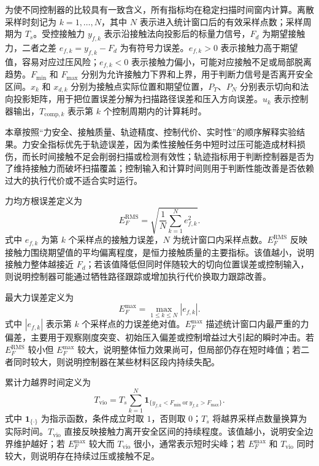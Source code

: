 为使不同控制器的比较具有一致含义，所有指标均在稳定扫描时间窗内计算。离散采样时刻记为 $k=1,\ldots,N$，其中 $N$ 表示进入统计窗口后的有效采样点数；采样周期为 $T_s$。受控接触力 $y_{f,k}$ 表示沿接触法向投影后的标量力信号，$F_d$ 为期望接触力，二者之差 $e_{f,k}=y_{f,k}-F_d$ 为有符号力误差。$e_{f,k}>0$ 表示接触力高于期望值，容易对应过压风险；$e_{f,k}<0$ 表示接触力偏小，可能对应接触不足或局部脱离趋势。$F_{\min}$ 和 $F_{\max}$ 分别为允许接触力下界和上界，用于判断力信号是否离开安全区间。$x_k$ 和 $x_{d,k}$ 分别为接触点实际位置和期望位置，$P_T$、$P_N$ 分别表示切向和法向投影矩阵，用于把位置误差分解为扫描路径误差和压入方向误差。$u_k$ 表示控制器输出，$T_{\mathrm{comp},k}$ 表示第 $k$ 个控制周期内的计算耗时。

本章按照“力安全、接触质量、轨迹精度、控制代价、实时性”的顺序解释实验结果。力安全指标优先于轨迹误差，因为柔性接触任务中短时过压可能造成材料损伤，而长时间接触不足会削弱扫描或检测有效性；轨迹指标用于判断控制器是否为了维持接触力而破坏扫描覆盖；控制输入和计算时间则用于判断性能改善是否依赖过大的执行代价或不适合实时运行。

力均方根误差定义为
\begin{equation}
  E_F^{\mathrm{RMS}}
  =\sqrt{\frac{1}{N}\sum_{k=1}^{N}e_{f,k}^2}.
  \label{eq:ch3_metric_force_rms}
\end{equation}
式中 $e_{f,k}$ 为第 $k$ 个采样点的接触力误差，$N$ 为统计窗口内采样点数。$E_F^{\mathrm{RMS}}$ 反映接触力围绕期望值的平均偏离程度，是恒力接触质量的主要指标。该值越小，说明接触力整体越接近 $F_d$；若该值降低但同时伴随较大的切向位置误差或控制输入，则说明控制器可能通过牺牲路径跟踪或增加执行代价换取力跟踪改善。

最大力误差定义为
\begin{equation}
  E_F^{\max}=\max_{1\le k\le N}|e_{f,k}| .
  \label{eq:ch3_metric_force_max}
\end{equation}
式中 $|e_{f,k}|$ 表示第 $k$ 个采样点的力误差绝对值。$E_F^{\max}$ 描述统计窗口内最严重的力偏差，主要用于观察刚度突变、初始压入偏差或控制增益过大引起的瞬时冲击。若 $E_F^{\mathrm{RMS}}$ 较小但 $E_F^{\max}$ 较大，说明整体恒力效果尚可，但局部仍存在短时峰值；若二者同时较大，则说明控制器在某些材料区段内持续失配。

累计力越界时间定义为
\begin{equation}
  T_{\mathrm{vio}}
  =T_s\sum_{k=1}^{N}
  \mathbf{1}_{\{y_{f,k}<F_{\min}\ \mathrm{or}\ y_{f,k}>F_{\max}\}}.
  \label{eq:ch3_metric_violation}
\end{equation}
式中 $\mathbf{1}_{\{\cdot\}}$ 为指示函数，条件成立时取 $1$，否则取 $0$；$T_s$ 将越界采样点数量换算为实际时间。$T_{\mathrm{vio}}$ 直接反映接触力离开安全区间的持续程度。该值越小，说明安全边界维护越好；若 $E_F^{\max}$ 较大而 $T_{\mathrm{vio}}$ 很小，通常表示短时尖峰；若 $E_F^{\max}$ 和 $T_{\mathrm{vio}}$ 同时较大，则说明存在持续过压或接触不足。

